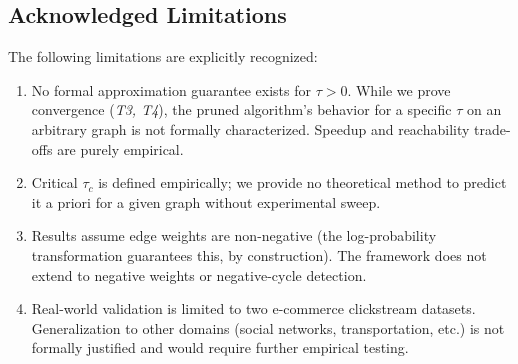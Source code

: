 \subsection{Acknowledged Limitations}

The following limitations are explicitly recognized:

\begin{enumerate}
\item[(L1)] No formal approximation guarantee exists for $\tau > 0$. While we prove convergence (\textit{T3, T4}), the pruned algorithm's behavior for a specific $\tau$ on an arbitrary graph is not formally characterized. Speedup and reachability trade-offs are purely empirical.
\item[(L2)] Critical $\tau_c$ is defined empirically; we provide no theoretical method to predict it a priori for a given graph without experimental sweep.
\item[(L3)] Results assume edge weights are non-negative (the log-probability transformation guarantees this, by construction). The framework does not extend to negative weights or negative-cycle detection.
\item[(L4)] Real-world validation is limited to two e-commerce clickstream datasets. Generalization to other domains (social networks, transportation, etc.) is not formally justified and would require further empirical testing.
\end{enumerate}
